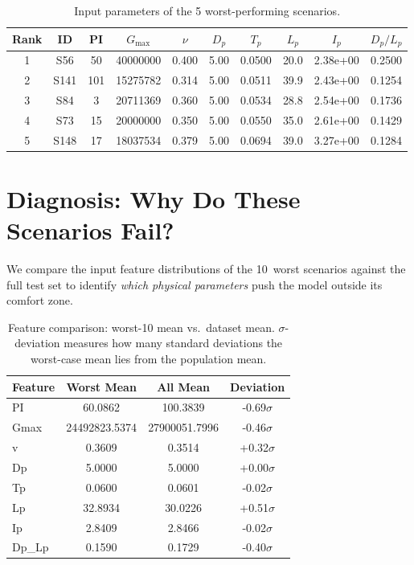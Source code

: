 \documentclass[11pt,a4paper]{article}
\begin{document}
\begin{table}[h]
\centering
\small
\caption{Input parameters of the 5 worst-performing scenarios.}
\begin{tabular}{cccccccccc}
\toprule
\textbf{Rank} & \textbf{ID} & \textbf{PI} & \textbf{$G_{\max}$} &
\textbf{$\nu$} & \textbf{$D_p$} & \textbf{$T_p$} & \textbf{$L_p$} &
\textbf{$I_p$} & \textbf{$D_p/L_p$} \\
\midrule
    1 & S56 & 50 & 40000000 & 0.400 & 5.00 & 0.0500 & 20.0 & 2.38e+00 & 0.2500 \\
    2 & S141 & 101 & 15275782 & 0.314 & 5.00 & 0.0511 & 39.9 & 2.43e+00 & 0.1254 \\
    3 & S84 & 3 & 20711369 & 0.360 & 5.00 & 0.0534 & 28.8 & 2.54e+00 & 0.1736 \\
    4 & S73 & 15 & 20000000 & 0.350 & 5.00 & 0.0550 & 35.0 & 2.61e+00 & 0.1429 \\
    5 & S148 & 17 & 18037534 & 0.379 & 5.00 & 0.0694 & 39.0 & 3.27e+00 & 0.1284 \\
\bottomrule
\end{tabular}
\label{tab:worst_params}
\end{table}

\section{Diagnosis: Why Do These Scenarios Fail?}
\label{sec:diagnosis}

We compare the input feature distributions of the 10~worst scenarios against
the full test set to identify \emph{which physical parameters} push the model
outside its comfort zone.

\begin{table}[h]
\centering
\caption{Feature comparison: worst-10 mean vs.\ dataset mean.
$\sigma$-deviation measures how many standard deviations the worst-case
mean lies from the population mean.}
\begin{tabular}{lccc}
\toprule
\textbf{Feature} & \textbf{Worst Mean} & \textbf{All Mean} & \textbf{Deviation} \\
\midrule
    PI & 60.0862 & 100.3839 & -0.69$\sigma$ \\
    Gmax & 24492823.5374 & 27900051.7996 & -0.46$\sigma$ \\
    v & 0.3609 & 0.3514 & +0.32$\sigma$ \\
    Dp & 5.0000 & 5.0000 & +0.00$\sigma$ \\
    Tp & 0.0600 & 0.0601 & -0.02$\sigma$ \\
    Lp & 32.8934 & 30.0226 & +0.51$\sigma$ \\
    Ip & 2.8409 & 2.8466 & -0.02$\sigma$ \\
    Dp_Lp & 0.1590 & 0.1729 & -0.40$\sigma$ \\
\bottomrule
\end{tabular}
\label{tab:diagnosis}
\end{table}
\end{document}
